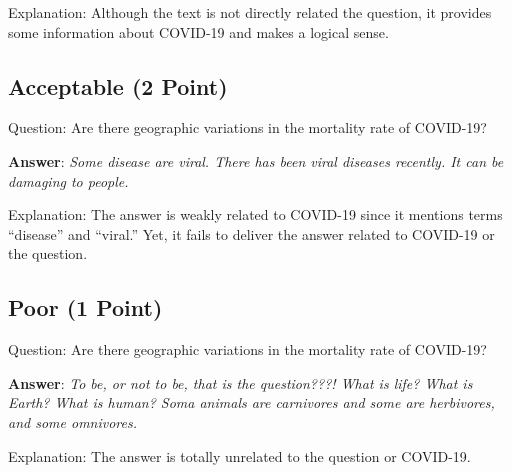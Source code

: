 \documentclass[11pt]{article}
\begin{document}
\medskip

Explanation: Although the text is not directly related the question, it
provides some information about COVID-19 and makes a logical sense.

\subsection{Acceptable (2 Point)}

Question: Are there geographic variations in the mortality rate of COVID-19?

\textbf{Answer}: \textit{Some disease are viral. There has been viral diseases
recently. It can be damaging to people.}

\medskip

Explanation: The answer is weakly related to COVID-19 since it mentions terms
``disease'' and ``viral.'' Yet, it fails to deliver the answer related to
COVID-19 or the question.

\subsection{Poor (1 Point)}

Question: Are there geographic variations in the mortality rate of COVID-19?

\textbf{Answer}: \textit{To be, or not to be, that is the question???! What is
life? What is Earth? What is human? Soma animals are carnivores and some are
herbivores, and some omnivores.}

\medskip

Explanation: The answer is totally unrelated to the question or COVID-19.

\end{document}
